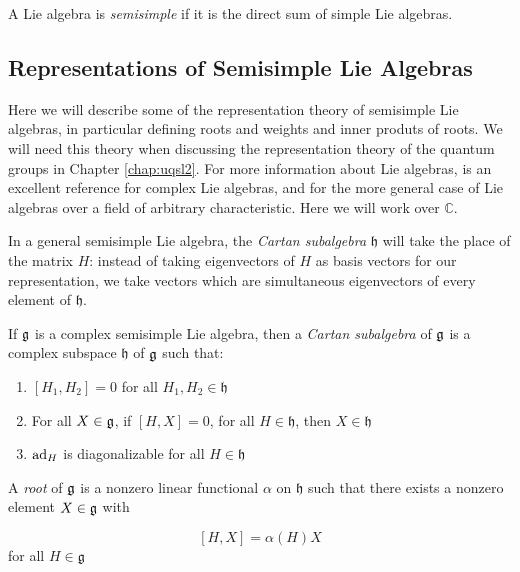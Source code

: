 \begin{defn}
    A Lie algebra is \emph{semisimple} if it is the direct sum of simple Lie
    algebras.
\end{defn}

\subsection{Representations of Semisimple Lie Algebras}

Here we will describe some of the representation theory of semisimple Lie
algebras, in particular defining roots and weights and inner produts of roots.
We will need this theory when discussing the representation theory of the
quantum groups in Chapter \ref{chap:uqsl2}. For more information about Lie
algebras, \cite{Hall2003} is an excellent reference for complex Lie algebras, and
\cite{Humphreys1973} for the more general case of Lie algebras over a field of
arbitrary characteristic. Here we will work over $\mathbb{C}$.

In a general semisimple Lie algebra, the \emph{Cartan subalgebra} $\mathfrak{h}$
will take the place of the matrix $H$: instead of taking eigenvectors of $H$ as
basis vectors for our representation, we take vectors which are simultaneous
eigenvectors of every element of $\mathfrak{h}$.

\begin{defn}
    If $\mathfrak{g}$ is a complex semisimple Lie algebra, then a \emph{Cartan
        subalgebra} of $\mathfrak{g}$ is a complex subspace $\mathfrak{h}$ of
        $\mathfrak{g}$ such that: 
    \begin{enumerate}
        \renewcommand{\labelenumi}{\roman{enumi})}
        \item $\left[ H_1, H_2 \right] = 0$ for all $H_1, H_2 \in \mathfrak{h}$
        \item For all $X \in \mathfrak{g}$, if $\left[ H,X \right] = 0$, for all $H
            \in \mathfrak{h}$, then $X \in \mathfrak{h}$
        \item $\operatorname{ad}_H$ is diagonalizable for all $H \in \mathfrak{h}$
    \end{enumerate}
\end{defn}

\begin{defn}
A \emph{root} of $\mathfrak{g}$ is a nonzero linear functional $\alpha$ on $\mathfrak{h}$ such that there exists a nonzero element $X \in \mathfrak{g}$ with 

\begin{equation}
\left[ H,X \right] = \alpha(H)X
\end{equation}
for all $H \in \mathfrak{g}$
\end{defn}


